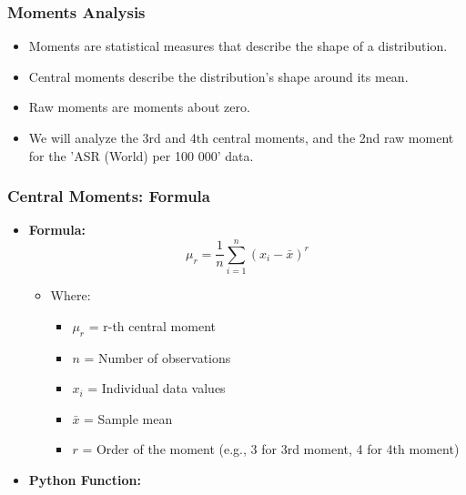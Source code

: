 \begin{frame}
    \frametitle{Moments Analysis}
    \begin{itemize}
        \item Moments are statistical measures that describe the shape of a distribution.
        \item Central moments describe the distribution's shape around its mean.
        \item Raw moments are moments about zero.
        \item We will analyze the 3rd and 4th central moments, and the 2nd raw moment for the 'ASR (World) per 100 000' data.
    \end{itemize}
\end{frame}

\begin{frame}[fragile]
    \frametitle{Central Moments: Formula}
    \begin{itemize}
        \item \textbf{Formula:}
              \[
                  \mu_r = \frac{1}{n} \sum_{i=1}^{n} (x_i - \bar{x})^r
              \]
              \begin{itemize}
                  \item Where:
                        \begin{itemize}
                            \item $\mu_r$ = r-th central moment
                            \item $n$ = Number of observations
                            \item $x_i$ = Individual data values
                            \item $\bar{x}$ = Sample mean
                            \item $r$ = Order of the moment (e.g., 3 for 3rd moment, 4 for 4th moment)
                        \end{itemize}
              \end{itemize}

        \item \textbf{Python Function:}
              \begin{verbatim}
              \end{verbatim}
    \end{itemize}
\end{frame}

